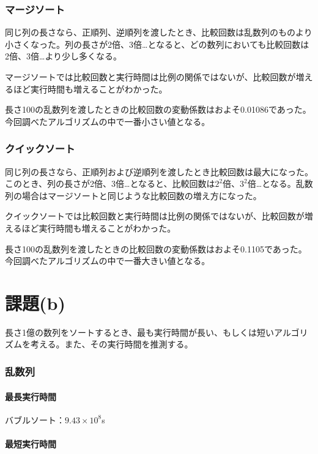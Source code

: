 \documentclass{jsarticle}
\begin{document}
\section{マージソート}

同じ列の長さなら、正順列、逆順列を渡したとき、比較回数は乱数列のものより小さくなった。列の長さが2倍、3倍…となると、どの数列においても比較回数は2倍、3倍…より少し多くなる。

マージソートでは比較回数と実行時間は比例の関係ではないが、比較回数が増えるほど実行時間も増えることがわかった。

長さ100の乱数列を渡したときの比較回数の変動係数はおよそ0.01086であった。今回調べたアルゴリズムの中で一番小さい値となる。

\section{クイックソート}

同じ列の長さなら、正順列および逆順列を渡したとき比較回数は最大になった。このとき、列の長さが2倍、3倍…となると、比較回数は$2^2$倍、$3^2$倍…となる。乱数列の場合はマージソートと同じような比較回数の増え方になった。

クイックソートでは比較回数と実行時間は比例の関係ではないが、比較回数が増えるほど実行時間も増えることがわかった。

長さ100の乱数列を渡したときの比較回数の変動係数はおよそ0.1105であった。今回調べたアルゴリズムの中で一番大きい値となる。

\part{課題(b)}

長さ1億の数列をソートするとき、最も実行時間が長い、もしくは短いアルゴリズムを考える。また、その実行時間を推測する。

\section{乱数列}

\subsection{最長実行時間}

バブルソート：$9.43 \times 10^8$s

\subsection{最短実行時間}
\end{document}
